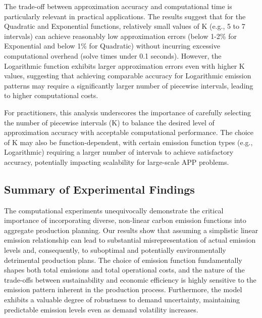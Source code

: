 \begin{table}[htbp]
\begin{table}[htbp]
\begin{table}[htbp]
\begin{table}[htbp]
\begin{table}[htbp]
The trade-off between approximation accuracy and computational time is particularly relevant in practical applications.  The results suggest that for the Quadratic and Exponential functions, relatively small values of K (e.g., 5 to 7 intervals) can achieve reasonably low approximation errors (below 1-2\% for Exponential and below 1\% for Quadratic) without incurring excessive computational overhead (solve times under 0.1 seconds).  However, the Logarithmic function exhibits larger approximation errors even with higher K values, suggesting that achieving comparable accuracy for Logarithmic emission patterns may require a significantly larger number of piecewise intervals, leading to higher computational costs.

For practitioners, this analysis underscores the importance of carefully selecting the number of piecewise intervals (K) to balance the desired level of approximation accuracy with acceptable computational performance.  The choice of K may also be function-dependent, with certain emission function types (e.g., Logarithmic) requiring a larger number of intervals to achieve satisfactory accuracy, potentially impacting scalability for large-scale APP problems.

\subsection{Summary of Experimental Findings}
\label{subsec:summary_of_experimental_findings}
The computational experiments unequivocally demonstrate the critical importance of incorporating diverse, non-linear carbon emission functions into aggregate production planning.  Our results show that assuming a simplistic linear emission relationship can lead to substantial misrepresentation of actual emission levels and, consequently, to suboptimal and potentially environmentally detrimental production plans. The choice of emission function fundamentally shapes both total emissions and total operational costs, and the nature of the trade-offs between sustainability and economic efficiency is highly sensitive to the emission pattern inherent in the production process.  Furthermore, the model exhibits a valuable degree of robustness to demand uncertainty, maintaining predictable emission levels even as demand volatility increases.


\end{table}
\end{table}
\end{table}
\end{table}
\end{table}
